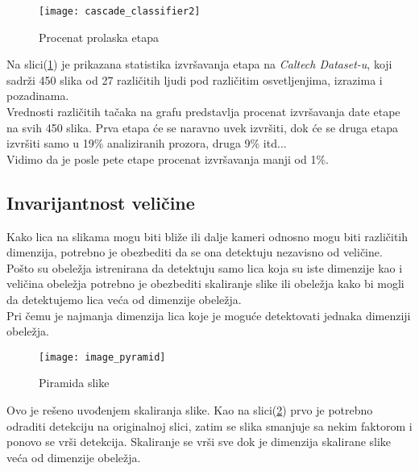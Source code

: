 \newpage

\begin{figure}[h]
  \centering
  \texttt{[image: cascade\_classifier2]}
  \caption{Procenat prolaska etapa}
  \label{cascade_classifier_img2}
\end{figure}

Na slici(\ref{cascade_classifier_img2}) je prikazana statistika izvršavanja
etapa na \emph{Caltech Dataset-u}\cite{CALTECH_DATASET}, koji sadrži 450 slika
od 27 različitih ljudi pod različitim osvetljenjima, izrazima i pozadinama. \\

Vrednosti različitih tačaka na grafu predstavlja procenat izvršavanja date etape
na svih 450 slika. Prva etapa će se naravno uvek izvršiti, dok će se druga etapa
izvršiti samo u 19\% analiziranih prozora, druga 9\% itd... \\
Vidimo da je posle pete etape procenat izvršavanja manji od 1\%. \\

\newpage

\subsection{Invarijantnost veličine}

Kako lica na slikama mogu biti bliže ili dalje kameri odnosno mogu biti
različitih dimenzija, potrebno je obezbediti da se ona detektuju nezavisno od
veličine. \\

Pošto su obeležja istrenirana da detektuju samo lica koja su iste dimenzije kao
i veličina obeležja potrebno je obezbediti skaliranje slike ili obeležja kako bi
mogli da detektujemo lica veća od dimenzije obeležja. \\
Pri čemu je najmanja dimenzija lica koje je moguće detektovati jednaka dimenziji obeležja.

\begin{figure}[h]
  \centering
  \texttt{[image: image\_pyramid]}
  \caption{Piramida slike\cite{ImagePyramid_web}}
  \label{image_pyramid}
\end{figure}

Ovo je rešeno uvođenjem skaliranja slike. Kao na slici(\ref{image_pyramid}) prvo
je potrebno odraditi detekciju na originalnoj slici, zatim se slika smanjuje sa
nekim faktorom i ponovo se vrši detekcija.
Skaliranje se vrši sve dok je dimenzija skalirane slike veća od dimenzije obeležja.

